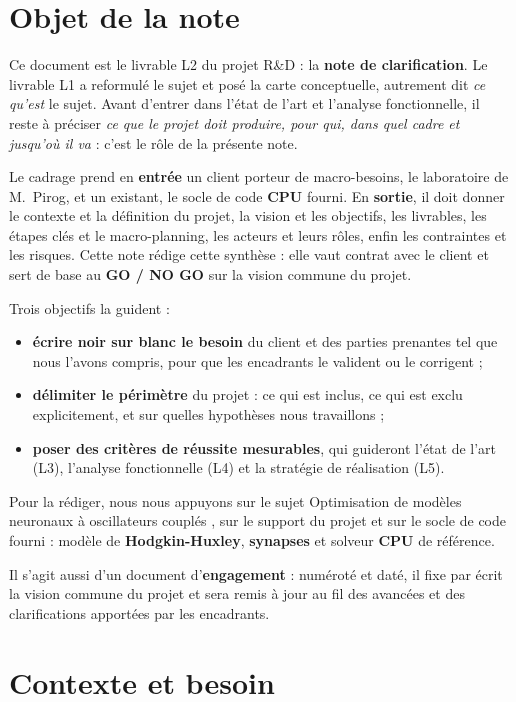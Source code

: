\chapter{Objet de la note}

Ce document est le livrable L2 du projet R\&D : la \textbf{note de clarification}. Le livrable L1 a reformulé le sujet et posé la carte conceptuelle, autrement dit \emph{ce qu'est} le sujet. Avant d'entrer dans l'état de l'art et l'analyse fonctionnelle, il reste à préciser \emph{ce que le projet doit produire, pour qui, dans quel cadre et jusqu'où il va} : c'est le rôle de la présente note.

Le cadrage prend en \textbf{entrée} un client porteur de macro-besoins, le laboratoire de M.~Pirog, et un existant, le socle de code \textbf{CPU} fourni. En \textbf{sortie}, il doit donner le contexte et la définition du projet, la vision et les objectifs, les livrables, les étapes clés et le macro-planning, les acteurs et leurs rôles, enfin les contraintes et les risques. Cette note rédige cette synthèse : elle vaut \og contrat \fg{} avec le client et sert de base au \textbf{GO / NO GO} sur la vision commune du projet.

Trois objectifs la guident :
\begin{itemize}
    \item \textbf{écrire noir sur blanc le besoin} du client et des parties prenantes tel que nous l'avons compris, pour que les encadrants le valident ou le corrigent ;
    \item \textbf{délimiter le périmètre} du projet : ce qui est inclus, ce qui est exclu explicitement, et sur quelles hypothèses nous travaillons ;
    \item \textbf{poser des critères de réussite mesurables}, qui guideront l'état de l'art (L3), l'analyse fonctionnelle (L4) et la stratégie de réalisation (L5).
\end{itemize}

Pour la rédiger, nous nous appuyons sur le sujet \og Optimisation de modèles neuronaux à oscillateurs couplés \fg{}, sur le support du projet et sur le socle de code fourni : modèle de \textbf{Hodgkin-Huxley}, \textbf{synapses} et solveur \textbf{CPU} de référence.

Il s'agit aussi d'un document d'\textbf{engagement} : numéroté et daté, il fixe par écrit la vision commune du projet et sera remis à jour au fil des avancées et des clarifications apportées par les encadrants.

\chapter{Contexte et besoin}

